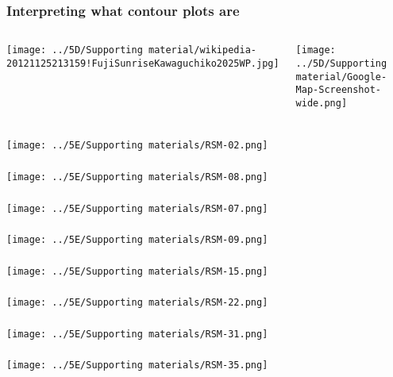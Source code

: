 \documentclass[handout,11pt,aspectratio=169,mathserif]{beamer}
\begin{document}
\begin{frame}\frametitle{Interpreting what contour plots are}
	\begin{columns}[b]
			\centerline{\texttt{[image: ../5D/Supporting material/wikipedia-20121125213159!FujiSunriseKawaguchiko2025WP.jpg]}}
			
		
			\centerline{\texttt{[image: ../5D/Supporting material/Google-Map-Screenshot-wide.png]}}

	\end{columns}
	
\end{frame}

\begin{frame}\frametitle{}
	\centerline{\texttt{[image: ../5E/Supporting materials/RSM-02.png]}}
\end{frame}
\begin{frame}\frametitle{}
	\centerline{\texttt{[image: ../5E/Supporting materials/RSM-08.png]}}
\end{frame}
\begin{frame}\frametitle{}
	\centerline{\texttt{[image: ../5E/Supporting materials/RSM-07.png]}}
\end{frame}
\begin{frame}\frametitle{}
	\centerline{\texttt{[image: ../5E/Supporting materials/RSM-09.png]}}
\end{frame}
\begin{frame}\frametitle{}
	\centerline{\texttt{[image: ../5E/Supporting materials/RSM-15.png]}}
\end{frame}
\begin{frame}\frametitle{}
	\centerline{\texttt{[image: ../5E/Supporting materials/RSM-22.png]}}
\end{frame}
\begin{frame}\frametitle{}
	\centerline{\texttt{[image: ../5E/Supporting materials/RSM-31.png]}}
\end{frame}
\begin{frame}\frametitle{}
	\centerline{\texttt{[image: ../5E/Supporting materials/RSM-35.png]}}
\end{frame}
\end{document}
